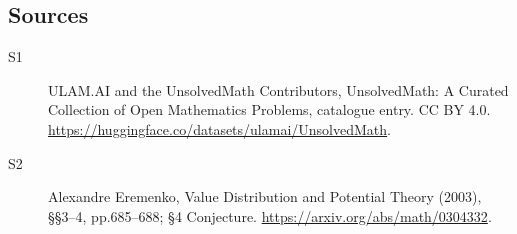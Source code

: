 \documentclass[11pt]{article}
\begin{document}
\subsection{Sources}
\begin{description}
\item[\hypertarget{source:statement:1}{S1}] ULAM.AI and the UnsolvedMath Contributors, UnsolvedMath: A Curated Collection of Open Mathematics Problems, catalogue entry. CC BY 4.0. \url{https://huggingface.co/datasets/ulamai/UnsolvedMath}.
\item[\hypertarget{source:statement:2}{S2}] Alexandre Eremenko, Value Distribution and Potential Theory (2003), §§3–4, pp.685–688; §4 Conjecture. \url{https://arxiv.org/abs/math/0304332}.
\end{description}
\label{end:statement}
\end{document}

